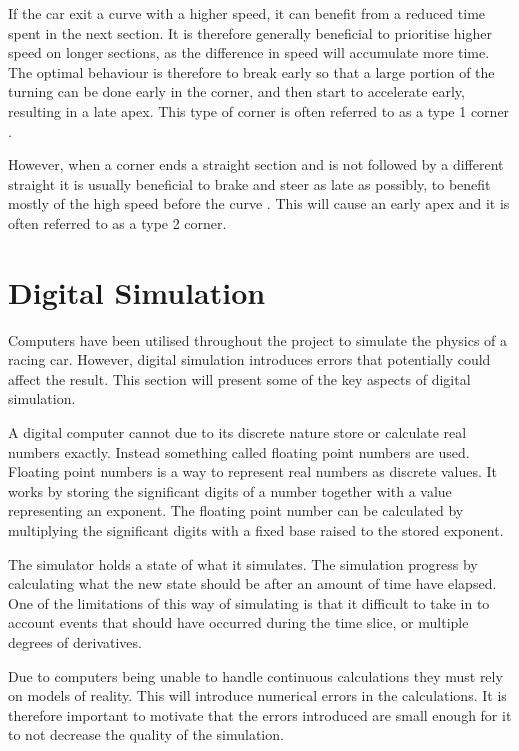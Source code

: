 If the car exit a curve with a higher speed, it can benefit from a reduced time spent in the next section. It is therefore generally beneficial to prioritise higher speed on longer sections\cite{beckman}, as the difference in speed will accumulate more time. The optimal behaviour is therefore to break early so that a large portion of the turning can be done early in the corner, and then start to accelerate early, resulting in a late apex. This type of corner is often referred to as a type 1 corner \cite{edmondson}.

However, when a corner ends a straight section and is not followed by a different straight it is usually beneficial to brake and steer as late as possibly, to benefit mostly of the high speed before the curve \cite{edmondson}. This will cause an early apex and it is often referred to as a type 2 corner.


\section{Digital Simulation}

Computers have been utilised throughout the project to simulate the physics of a racing car. However, digital simulation introduces errors that potentially could affect the result. This section will present some of the key aspects of digital simulation. 

A digital computer cannot due to its discrete nature store or calculate real numbers exactly. Instead something called floating point numbers are used. Floating point numbers is a way to represent real numbers as discrete values. It works by storing the significant digits of a number together with a value representing an exponent. The floating point number can be calculated by multiplying the significant digits with a fixed base raised to the stored exponent.

The simulator holds a state of what it simulates. The simulation progress by calculating what the new state should be after an amount of time have elapsed. One of the limitations of this way of simulating is that it difficult to take in to account events that should have occurred during the time slice, or multiple degrees of derivatives. 

Due to computers being unable to handle continuous calculations they must rely on models of reality. This will introduce numerical errors in the calculations. It is therefore important to motivate that the errors introduced are small enough for it to not decrease the quality of the simulation.



